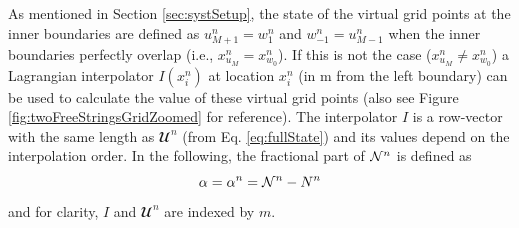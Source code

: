 As mentioned in Section \ref{sec:systSetup}, the state of the virtual grid points at the inner boundaries are defined as $u_{M+1}^n = w_1^n$ and $w_{-1}^n = u_{M-1}^n$ when the inner boundaries perfectly overlap  (i.e., $x^n_{u_M} = x^n_{w_0}$). If this is not the case ($x^n_{u_M} \neq x^n_{w_0}$) a Lagrangian interpolator $I(x_i^n)$ at location $x_i^n$ (in m from the left boundary) can be used to calculate the value of these virtual grid points (also see Figure \ref{fig:twoFreeStringsGridZoomed} for reference). The interpolator $I$ is a row-vector with the same length as $\mathbfcal{U}^n$ (from Eq. \eqref{eq:fullState}) and its values depend on the interpolation order. %
In the following, the fractional part of $\mathcal{N}^n$ %
is defined as 
\begin{equation}\label{eq:alphaDef}
    \alpha = \alpha^n = \Nfrac^n - N^n %
\end{equation}
 and for clarity, $I$ and $\mathbfcal{U}^n$ are indexed by $m$.
